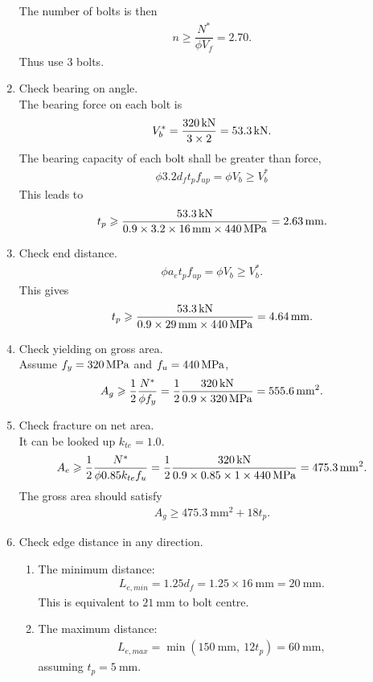 \begin{solution}
\begin{enumerate}
The number of bolts is then
\begin{gather*}
n\geqslant\dfrac{N^*}{\phi{}V_f}=2.70.
\end{gather*}
Thus use \num{3} bolts.
\item Check bearing on angle.\\
The bearing force on each bolt is
\begin{gather*}
V^*_b=\dfrac{\SI{320}{\kilo\newton}}{3\times2}=\SI{53.3}{\kilo\newton}.
\end{gather*}
The bearing capacity of each bolt shall be greater than force,
\begin{gather*}
\phi3.2d_ft_pf_{up}=\phi{}V_b\geqslant{}V^*_b
\end{gather*}
This leads to
\begin{gather*}
t_p\geqslant\dfrac{\SI{53.3}{\kilo\newton}}{0.9\times3.2\times\SI{16}{\milli\meter}\times\SI{440}{\mega\pascal}}=\SI{2.63}{\milli\meter}.
\end{gather*}
\item Check end distance.
\begin{gather*}
\phi{}a_et_pf_{up}=\phi{}V_b\geqslant{}V^*_b.
\end{gather*}
This gives
\begin{gather*}
t_p\geqslant{}\dfrac{\SI{53.3}{\kilo\newton}}{0.9\times\SI{29}{\milli\meter}\times\SI{440}{\mega\pascal}}=\SI{4.64}{\milli\meter}.
\end{gather*}
\item Check yielding on gross area.\\
Assume $f_y=\SI{320}{\mega\pascal}$ and $f_u=\SI{440}{\mega\pascal}$,
\begin{gather*}
A_g\geqslant\dfrac{1}{2}\dfrac{N^*}{\phi{}f_y}=\dfrac{1}{2}\dfrac{\SI{320}{\kilo\newton}}{0.9\times\SI{320}{\mega\pascal}}=\SI{555.6}{\milli\meter^2}.
\end{gather*}
\item Check fracture on net area.\\
It can be looked up $k_{te}=1.0$.
\begin{gather*}
A_e\geqslant\dfrac{1}{2}\dfrac{N^*}{\phi{}0.85k_{te}f_u}=\dfrac{1}{2}\dfrac{\SI{320}{\kilo\newton}}{0.9\times0.85\times1\times\SI{440}{\mega\pascal}}=\SI{475.3}{\milli\meter^2}.
\end{gather*}
The gross area should satisfy
\begin{gather*}
A_g\geqslant\SI{475.3}{\mm^2}+18t_p.
\end{gather*}
\item Check edge distance in any direction.
\begin{enumerate}
\item The minimum distance:
\begin{gather*}
L_{e,min}=1.25d_f=1.25\times\SI{16}{\mm}=\SI{20}{\mm}.
\end{gather*}
This is equivalent to $\SI{21}{\mm}$ to bolt centre.
\item The maximum distance:
\begin{align*}
L_{e,max}=\min\left(\SI{150}{\mm},~12t_p\right)=\SI{60}{\mm},
\end{align*}
assuming $t_p=\SI{5}{\mm}$.
\end{enumerate}
\end{enumerate}


\end{solution}
